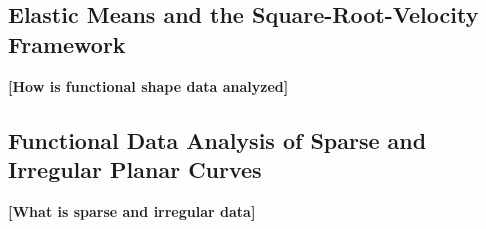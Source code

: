 \subsection{Elastic Means and the Square-Root-Velocity Framework}
\label{intro:srv}
\textbf{[How is functional shape data analyzed]}


\subsection{Functional Data Analysis of Sparse and Irregular Planar Curves}
\label{intro:sparse}
\textbf{[What is sparse and irregular data]}



\newpage
